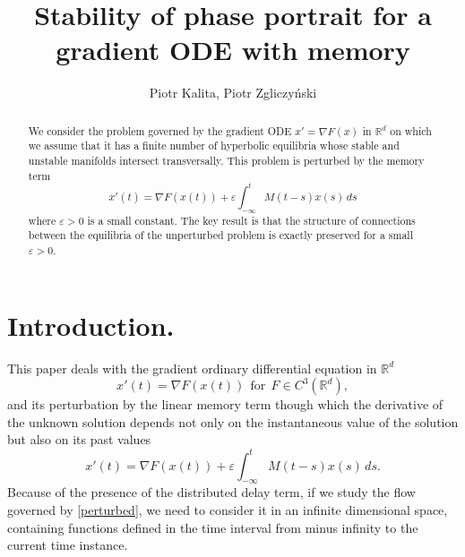\documentclass[11pt, leqno]{amsart}
\theoremstyle{definition}
\begin{document}
\title{Stability of phase portrait for a gradient ODE with memory}


\author{Piotr Kalita, Piotr Zgliczyński}
\address{Faculty of Mathematics and Computer Science, Jagiellonian University,
	ul. Łojasiewicza 6, 30-348 Kraków, Poland}


\begin{abstract}
We consider the problem governed by the gradient ODE $x'=\nabla F(x)$ in $\mathbb{R}^d$ on which we assume that it has a finite number of hyperbolic equilibria whose stable and unstable manifolds intersect transversally. This problem is perturbed by the memory term 
$$x'(t)=\nabla F(x(t))+\varepsilon\int_{-\infty}^t M(t-s)x(s)\, ds$$ where $\varepsilon>0$ is a small constant. The key result is that the structure of connections between the equilibria of the unperturbed problem is exactly preserved for a small $\varepsilon>0$.
\end{abstract}



 \maketitle
 
 
\tableofcontents

\section{Introduction.}
\noindent This paper deals with the gradient ordinary differential equation in $\mathbb{R}^d$
\begin{equation}\label{unperturbed}
x'(t) = \nabla F(x(t))\ \ \textrm{for}\ \ F\in C^3(\mathbb{R}^d),
\end{equation}
and its perturbation by the linear memory term though which the derivative of the unknown solution depends not only on the instantaneous value of the solution but also on its past values
\begin{equation}\label{perturbed}
x'(t) = \nabla F(x(t)) + \varepsilon\int_{-\infty}^tM(t-s)x(s)\, ds.
\end{equation}
Because of the presence of the distributed delay term, if we study the flow governed by \eqref{perturbed}, we need to consider it in an infinite dimensional space, containing functions defined in the time interval from minus infinity to the current time instance.
\end{document}
